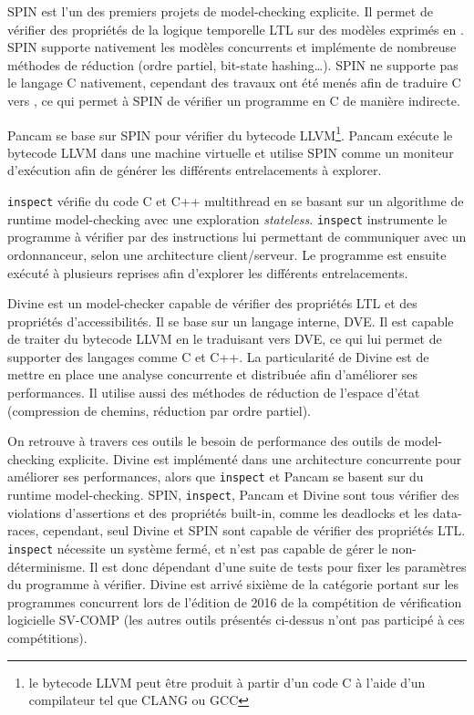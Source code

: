 SPIN\cite{SPIN} est l'un des premiers projets de model-checking
explicite. Il permet de vérifier des propriétés de la logique temporelle
LTL sur des modèles exprimés en . SPIN supporte nativement
les modèles concurrents et implémente de nombreuse méthodes de réduction
(ordre partiel, bit-state hashing\dots). SPIN ne supporte pas le langage
C nativement, cependant des travaux ont été menés afin de traduire C
vers \cite{jiang_C_to_Promela}, ce qui permet à SPIN de
vérifier un programme en C de manière indirecte.

Pancam\cite{Pancam} se base sur SPIN pour vérifier du bytecode
LLVM\footnote{le bytecode LLVM peut être produit à partir d'un code C à
  l'aide d'un compilateur tel que CLANG ou GCC}. Pancam exécute le
bytecode LLVM dans une machine virtuelle et utilise SPIN comme un
moniteur d'exécution afin de générer les différents entrelacements à
explorer.

\lstinline!inspect!\cite{inspect} vérifie du code C et C++
multithread en se basant sur un algorithme de runtime model-checking
avec une exploration \emph{stateless}. \lstinline!inspect! instrumente
le programme à vérifier par des instructions lui permettant de
communiquer avec un ordonnanceur, selon une architecture client/serveur.
Le programme est ensuite exécuté à plusieurs reprises afin d'explorer les
différents entrelacements.

Divine\cite{Divine_3_0} est un model-checker capable de vérifier des
propriétés LTL et des propriétés d'accessibilités. Il se base sur un
langage interne, DVE. Il est capable de traiter du bytecode LLVM en le
traduisant vers DVE, ce qui lui permet de supporter des langages comme C
et C++. La particularité de Divine est de mettre en place une analyse
concurrente et distribuée afin d'améliorer ses performances. Il utilise
aussi des méthodes de réduction de l'espace d'état (compression de
chemins, réduction par ordre partiel).

On retrouve à travers ces outils le besoin de performance des outils de
model-checking explicite. Divine est implémenté dans une architecture
concurrente pour améliorer ses performances, alors que \lstinline!inspect! et
Pancam se basent sur du runtime model-checking. SPIN, \lstinline!inspect!,
Pancam et Divine sont tous vérifier des violations d'assertions et des
propriétés built-in, comme les deadlocks et les data-races, cependant, seul
Divine et SPIN sont capable de vérifier des propriétés LTL. \lstinline!inspect!
nécessite un système fermé, et n'est pas capable de gérer le non-déterminisme.
Il est donc dépendant d'une suite de tests pour fixer les paramètres du
programme à vérifier. Divine est arrivé sixième de la catégorie portant sur les
programmes concurrent lors de l'édition de 2016 de la compétition de
vérification logicielle SV-COMP\citep{svcomp_2016_result} (les autres outils présentés
ci-dessus n'ont pas participé à ces compétitions).


